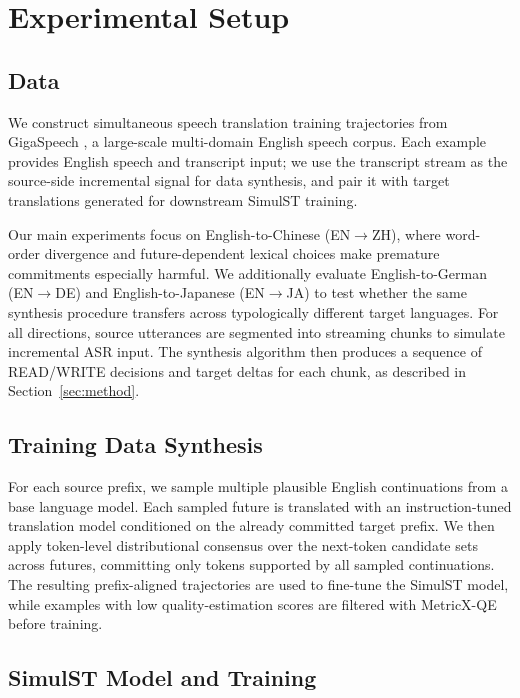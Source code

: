 \section{Experimental Setup}

\subsection{Data}

We construct simultaneous speech translation training trajectories from
GigaSpeech \citep{chen2021gigaspeech}, a large-scale multi-domain English
speech corpus. Each example provides English speech and transcript input; we
use the transcript stream as the source-side incremental signal for data
synthesis, and pair it with target translations generated for downstream
SimulST training.

Our main experiments focus on English-to-Chinese (EN$\rightarrow$ZH), where
word-order divergence and future-dependent lexical choices make premature
commitments especially harmful. We additionally evaluate
English-to-German (EN$\rightarrow$DE) and English-to-Japanese
(EN$\rightarrow$JA) to test whether the same synthesis procedure transfers
across typologically different target languages. For all directions, source
utterances are segmented into streaming chunks to simulate incremental ASR
input. The synthesis algorithm then produces a sequence of READ/WRITE
decisions and target deltas for each chunk, as described in
Section~\ref{sec:method}.

\subsection{Training Data Synthesis}

For each source prefix, we sample multiple plausible English continuations
from a base language model. Each sampled future is translated with an
instruction-tuned translation model conditioned on the already committed
target prefix. We then apply token-level distributional consensus over the
next-token candidate sets across futures, committing only tokens supported by
all sampled continuations. The resulting prefix-aligned trajectories are used
to fine-tune the SimulST model, while examples with low quality-estimation
scores are filtered with MetricX-QE before training.

\subsection{SimulST Model and Training}
\label{sec:setup-training}

